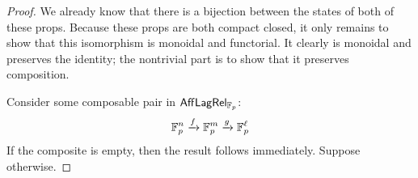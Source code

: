 %
\begin{proof}
We already know that there is a bijection between the states of both of these props. Because these props are both compact closed, it only remains to show that this isomorphism is monoidal and functorial.  It clearly is monoidal and preserves the identity; the nontrivial part is to show that it preserves composition.

Consider some composable pair in $\mathsf{Aff}\mathsf{Lag}\mathsf{Rel}_{\mathbb{F}_p}$:
$$
\mathbb{F}_p^n \xrightarrow{f} \mathbb{F}_p^m \xrightarrow{g} \mathbb{F}_p^\ell
$$
If the composite is empty, then the result follows immediately.  Suppose otherwise.



\end{proof}
